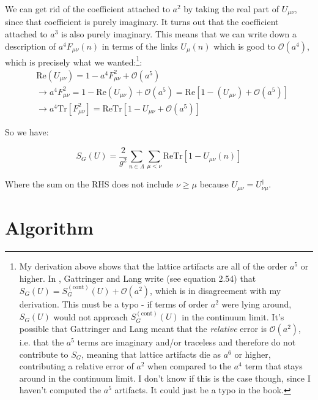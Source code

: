 \documentclass[11pt]{article}
\begin{document}
We can get rid of the coefficient attached to $a^2$ by taking the real part of $U_{\mu\nu}$, since that coefficient is purely imaginary. It turns out that the coefficient attached to $a^3$ is also purely imaginary. This means that we can write down a description of $a^4F_{\mu\nu}(n)$ in terms of the links $U_\mu(n)$ which is good to $\mathcal O(a^4)$, which is precisely what we wanted:\footnote{My derivation above shows that the lattice artifacts are all of the order $a^5$ or higher. In \cite{gattringer_lang_2009}, Gattringer and Lang write (see equation 2.54) that $S_G(U)=S_G^{(\mathrm{cont})}(U)+\mathcal O(a^2)$, which is in disagreement with my derivation. This must be a typo - if terms of order $a^2$ were lying around, $S_G(U)$ would not approach $S_G^{(\mathrm{cont})}(U)$ in the continuum limit. It's possible that Gattringer and Lang meant that the \textit{relative} error is $\mathcal O(a^2)$, i.e. that the $a^5$ terms are imaginary and/or traceless and therefore do not contribute to $S_G$, meaning that lattice artifacts die as $a^6$ or higher, contributing a relative error of $a^2$ when compared to the $a^4$ term that stays around in the continuum limit. I don't know if this is the case though, since I haven't computed the $a^5$ artifacts. It could just be a typo in the book.}: 
\begin{align*}&\mathrm{Re}\left(U_{\mu\nu}\right)=1-a^4F_{\mu\nu}^2+\mathcal O(a^5)\\&\rightarrow a^4F_{\mu\nu}^2=1-\mathrm{Re}\left(U_{\mu\nu}\right)+\mathcal O(a^5)=\mathrm{Re}\left[1-\left(U_{\mu\nu}\right)+\mathcal O(a^5)\right]\\&\rightarrow a^4\mathrm{Tr}\left[F_{\mu\nu}^2\right]=\mathrm{ReTr}\left[1-U_{\mu\nu}+\mathcal O(a^5)\right]\end{align*}

So we have:

\begin{equation}\label{eq:S_G}S_G(U)=\frac{2}{g^2}\sum_{n\in\Lambda}\sum_{\mu<\nu}\mathrm{Re}\mathrm{Tr}[1-U_{\mu\nu}(n)]\end{equation}

Where the sum on the RHS does not include $\nu\geq\mu$ because $U_{\mu\nu}=U_{\nu\mu}^\dagger$. 

\section{Algorithm}
\end{document}
